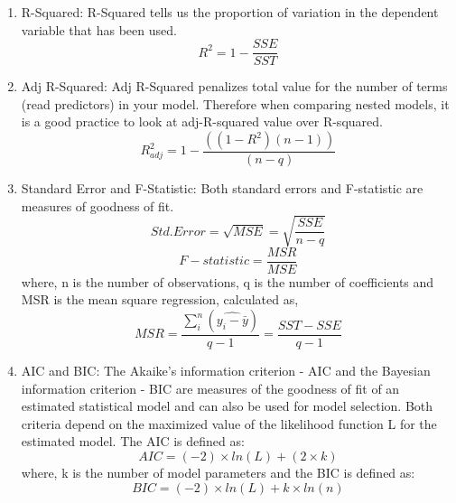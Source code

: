 \documentclass[a4paper,10pt]{article}
\begin{document}
\begin{enumerate}
		\item R-Squared:
			R-Squared tells us the proportion of variation in the dependent variable that has been used.
			\begin{equation}
				R^2=1-\frac{SSE}{SST}
			\end{equation}
		\item Adj R-Squared:
			  Adj R-Squared penalizes total value for the number of terms (read predictors) in your model. Therefore when comparing nested models, it is a good practice to look at adj-R-squared value over R-squared.
			\begin{equation}
				R^2_{adj}=1-\frac{((1-R^2)(n-1))}{(n-q)}
			\end{equation}
		\item Standard Error and F-Statistic:
			  Both standard errors and F-statistic are measures of goodness of fit.
			\begin{equation}
				Std. Error = \sqrt{MSE} = \sqrt{\frac{SSE}{n-q}}
			\end{equation}
			\begin{equation}
				F-statistic = \frac{MSR}{MSE}
			\end{equation}
			where, n is the number of observations, q is the number of coefficients and MSR is the mean square regression, calculated as,
			\begin{equation}
				MSR=\frac{\sum_{i}^{n}\left( \hat{y_{i} - \bar{y}}\right)}{q-1} = \frac{SST - SSE}{q - 1}
			\end{equation}
		\item AIC and BIC:
			  The Akaike’s information criterion - AIC  and the Bayesian information criterion - BIC are measures of the goodness of fit of an estimated statistical model and can also be used for model selection. Both criteria depend on the maximized value of the likelihood function L for the estimated model.
The AIC is defined as:
			\begin{equation}
				AIC = (−2) × ln(L) + (2×k)
			\end{equation}
		where, k is the number of model parameters and the BIC is defined as:
		    \begin{equation}
				BIC = (−2) × ln(L) + k × ln(n)
			\end{equation}

\end{enumerate}
\end{document}
